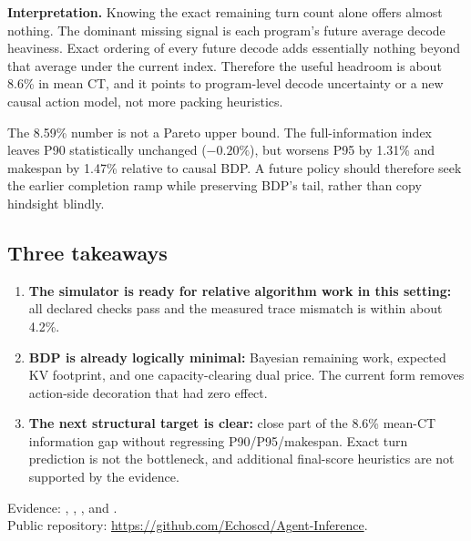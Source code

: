\documentclass[10pt]{article}
\newcommand{\keybox}[1]{%
  \begin{center}
  \colorbox{softblue}{\parbox{0.94\linewidth}{\small #1}}
  \end{center}}
\begin{document}
\keybox{\textbf{Interpretation.} Knowing the exact remaining turn count alone offers almost nothing. The dominant missing signal is each program's future average decode heaviness. Exact ordering of every future decode adds essentially nothing beyond that average under the current index. Therefore the useful headroom is about 8.6\% in mean CT, and it points to program-level decode uncertainty or a new causal action model, not more packing heuristics.}

The 8.59\% number is not a Pareto upper bound. The full-information index leaves P90 statistically unchanged ($-0.20\%$), but worsens P95 by 1.31\% and makespan by 1.47\% relative to causal BDP. A future policy should therefore seek the earlier completion ramp while preserving BDP's tail, rather than copy hindsight blindly.

\subsection*{Three takeaways}

\begin{enumerate}
\item \textbf{The simulator is ready for relative algorithm work in this setting:} all declared checks pass and the measured trace mismatch is within about 4.2\%.
\item \textbf{BDP is already logically minimal:} Bayesian remaining work, expected KV footprint, and one capacity-clearing dual price. The current form removes action-side decoration that had zero effect.
\item \textbf{The next structural target is clear:} close part of the 8.6\% mean-CT information gap without regressing P90/P95/makespan. Exact turn prediction is not the bottleneck, and additional final-score heuristics are not supported by the evidence.
\end{enumerate}

\vfill
{\footnotesize\color{darkgray}
Evidence: , ,
, and .\\
Public repository: \url{https://github.com/Echoscd/Agent-Inference}.}
\end{document}

